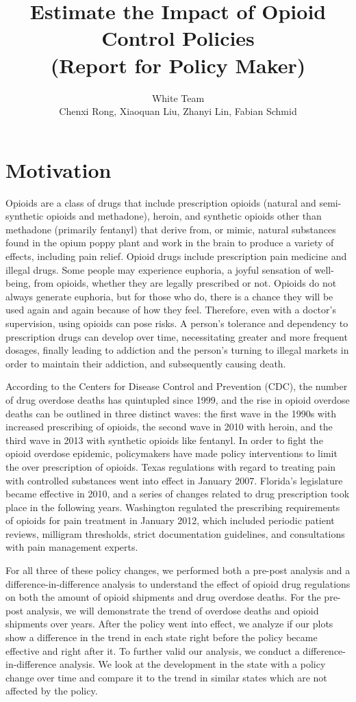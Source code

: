 \documentclass[12pt,letterpaper]{article}
\author{White Team \\ Chenxi Rong, Xiaoquan Liu, Zhanyi Lin, Fabian Schmid}
\title{Estimate the Impact of Opioid Control Policies \\ (Report for Policy Maker)}
\begin{document}
\maketitle

\section{Motivation}
Opioids are a class of drugs that include prescription opioids (natural and semi-synthetic opioids and methadone), heroin, and synthetic opioids other than methadone (primarily fentanyl) that derive from, or mimic, natural substances found in the opium poppy plant and work in the brain to produce a variety of effects, including pain relief. Opioid drugs include prescription pain medicine and illegal drugs. Some people may experience euphoria, a joyful sensation of well-being, from opioids, whether they are legally prescribed or not. Opioids do not always generate euphoria, but for those who do, there is a chance they will be used again and again because of how they feel. Therefore, even with a doctor's supervision, using opioids can pose risks. A person's tolerance and dependency to prescription drugs can develop over time, necessitating greater and more frequent dosages, finally leading to addiction and the person's turning to illegal markets in order to maintain their addiction, and subsequently causing death.

According to the Centers for Disease Control and Prevention (CDC), the number of drug overdose deaths has quintupled since 1999, and the rise in opioid overdose deaths can be outlined in three distinct waves: the first wave in the 1990s with increased prescribing of opioids, the second wave in 2010 with heroin, and the third wave in 2013 with synthetic opioids like fentanyl. In order to fight the opioid overdose epidemic, policymakers have made policy interventions to limit the over prescription of opioids. Texas regulations with regard to treating pain with controlled substances went into effect in January 2007. Florida's legislature became effective in 2010, and a series of changes related to drug prescription took place in the following years. Washington regulated the prescribing requirements of opioids for pain treatment in January 2012, which included periodic patient reviews, milligram thresholds, strict documentation guidelines, and consultations with pain management experts.

For all three of these policy changes, we performed both a pre-post analysis and a difference-in-difference analysis to understand the effect of opioid drug regulations on both the amount of opioid shipments and drug overdose deaths. For the pre-post analysis, we will demonstrate the trend of overdose deaths and opioid shipments over years. After the policy went into effect, we analyze if our plots show a difference in the trend in each state right before the policy became effective and right after it. To further valid our analysis, we conduct a difference-in-difference analysis. We look at the development in the state with a policy change over time and compare it to the trend in similar states which are not affected by the policy.
\end{document}
